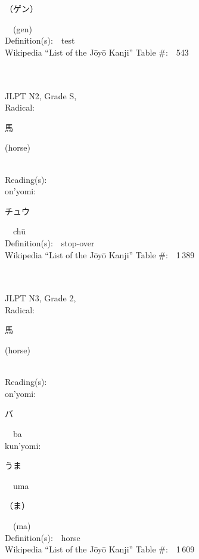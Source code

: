 \begin{multicols}{2}
{\hspace*{2em}}{\begin{CJK}{UTF8}{min} （ゲン） \end{CJK}}\ \ (gen)\ \ \\
Definition(s):\ \ test \\
Wikipedia ``List of the J\=oy\=o Kanji'' Table \#:\ \ 543 \\
\ \ \\
{\fontsize{34pt}{40pt}  }\ \ \\  %
{JLPT N2, Grade S, \\Radical:\ \ {\begin{CJK}{UTF8}{min} 馬 \end{CJK}} (horse) } \\
Reading(s):\ \ \\
{\hspace*{1em}}on'yomi:\ \ \\
{\hspace*{2em}}{\begin{CJK}{UTF8}{min} チュウ \end{CJK}}\ \ ch\=u\ \ \\
Definition(s):\ \ stop-over \\
Wikipedia ``List of the J\=oy\=o Kanji'' Table \#:\ \ 1\,389 \\
\ \ \\
{\fontsize{34pt}{40pt}  }\ \ \\  %
{JLPT N3, Grade 2, \\Radical:\ \ {\begin{CJK}{UTF8}{min} 馬 \end{CJK}} (horse) } \\
Reading(s):\ \ \\
{\hspace*{1em}}on'yomi:\ \ \\
{\hspace*{2em}}{\begin{CJK}{UTF8}{min} バ \end{CJK}}\ \ ba\ \ \\
{\hspace*{1em}}kun'yomi:\ \ \\
{\hspace*{2em}}{\begin{CJK}{UTF8}{min} うま \end{CJK}}\ \ uma\ \ \\
{\hspace*{2em}}{\begin{CJK}{UTF8}{min} （ま） \end{CJK}}\ \ (ma)\ \ \\
Definition(s):\ \ horse \\
Wikipedia ``List of the J\=oy\=o Kanji'' Table \#:\ \ 1\,609 \\
\ \ \\
\end{multicols}
